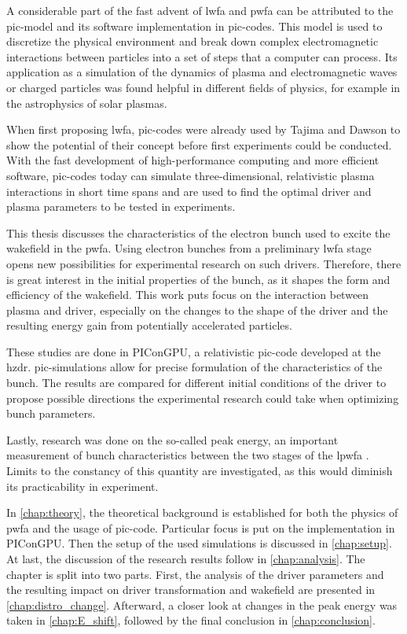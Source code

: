\documentclass[bachelor_thesis]{subfiles}
\begin{document}
A considerable part of the fast advent of \gls{lwfa} and \gls{pwfa} can be attributed to the \gls{pic}-model and its software implementation in \gls{pic}-codes.
This model is used to discretize the physical environment and break down complex electromagnetic interactions between particles into a set of steps that a computer can process.
Its application as a simulation of the dynamics of plasma and electromagnetic waves or charged particles was found helpful in different fields of physics, for example in the astrophysics of solar plasmas.

When first proposing \gls{lwfa}, \gls{pic}-codes were already used by Tajima and Dawson to show the potential of their concept before first experiments could be conducted. 
With the fast development of high-performance computing and more efficient software, \gls{pic}-codes today can simulate three-dimensional, relativistic plasma interactions in short time spans
and are used to find the optimal driver and plasma parameters to be tested in experiments.

This thesis discusses the characteristics of the electron bunch used to excite the wakefield in the \gls{pwfa}.
Using electron bunches from a preliminary \gls{lwfa} stage opens new possibilities for experimental research on such drivers.
Therefore, there is great interest in the initial properties of the bunch, as it shapes the form and efficiency of the wakefield.
This work puts focus on the interaction between plasma and driver, especially on the changes to the shape of the driver and the resulting energy gain from potentially accelerated particles.

These studies are done in PIConGPU, a relativistic \gls{pic}-code developed at the \gls{hzdr}. \gls{pic}-simulations allow for precise formulation of the characteristics of the bunch.
The results are compared for different initial conditions of the driver to propose possible directions the experimental research could take when optimizing bunch parameters.

Lastly, research was done on the so-called peak energy, an important measurement of bunch characteristics between the two stages of the \gls{lpwfa} \cite{Schoebel2022}.
Limits to the constancy of this quantity are investigated, as this would diminish its practicability in experiment.

In \autoref{chap:theory}, the theoretical background is established for both the physics of \gls{pwfa} and the usage of \gls{pic}-code. Particular focus is put on the implementation in PIConGPU.
Then the setup of the used simulations is discussed in \autoref{chap:setup}.
At last, the discussion of the research results follow in \autoref{chap:analysis}. The chapter is split into two parts. First, the analysis of the driver parameters and the resulting impact on driver transformation and wakefield are presented in \autoref{chap:distro_change}.
Afterward, a closer look at changes in the peak energy was taken in \autoref{chap:E_shift}, followed by the final conclusion in \autoref{chap:conclusion}.
\end{document}
